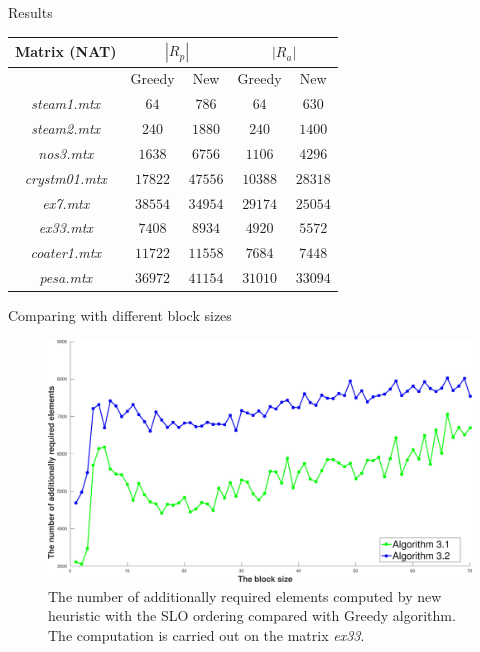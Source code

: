 \documentclass{beamer}
\begin{document}
\begin{frame}{Results}
\begin{table}
\begin{center}
\begin{tabular}{|c|c|c|c|c|}
\hline
Matrix (NAT) & \multicolumn{2}{c|}{$|R_p|$} & \multicolumn{2}{c|}{$|R_a|$}\\\hline
{} & Greedy & New & Greedy & New\\\hline
\textit{steam1.mtx} & $64$ & $786$ & $64$ & $630$ \\\hline
\textit{steam2.mtx} & $240$ & $1880$ & $240$ & $1400$ \\\hline
\textit{nos3.mtx} & $1638$ & $6756$ & $1106$ & $4296$ \\\hline
\textit{crystm01.mtx} & $17822$ & $47556$ & $10388$ & $28318$ \\\hline
\textit{ex7.mtx} & $38554$ & $34954$ & $29174$ & $25054$ \\\hline
\textit{ex33.mtx} & $7408$ & $8934$ & $4920$ & $5572$ \\\hline
\textit{coater1.mtx} & $11722$ & $11558$ & $7684$ & $7448$ \\\hline
\textit{pesa.mtx} & $36972$ & $41154$ & $31010$ & $33094$ \\\hline
\end{tabular}
\end{center}
\end{table}
\end{frame}

\begin{frame}{Comparing with different block sizes}
\begin{figure}
\centering
\includegraphics[width=0.9\linewidth]{ex33_alg31_alg32_bls_slo_add}
\caption{
The number of additionally required elements computed by
new heuristic with the SLO ordering
compared with Greedy algorithm.
The computation is carried out on the matrix \textit{ex33}. }
\label{ex33_alg31_alg32_bls_slo_add}
\end{figure}
\end{frame}
\end{document}
